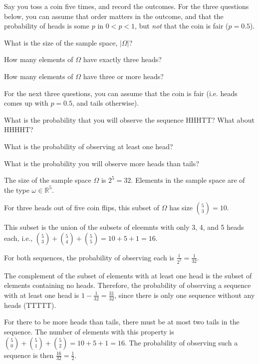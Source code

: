 \documentclass[11pt]{article}
\begin{document}

Say you toss a coin five times, and record the outcomes. For the three questions
below, you can assume that order matters in the outcome, and that the
probability of heads is some $p$ in $0 < p < 1$, but \textit{not} that the coin
is fair ($p = 0.5$).

\begin{Parts}
\Part What is the size of the sample space, $|\Omega|$?

\Part How many elements of $\Omega$ have exactly three heads?

\Part How many elements of $\Omega$ have three or more heads?
\end{Parts}

For the next three questions, you can assume that the coin is fair (i.e. heads 
comes up with $p=0.5$, and tails otherwise).

\begin{Parts}[resume]
\Part What is the probability that you will observe the sequence HHHTT? What 
about HHHHT?

\Part What is the probability of observing at least one head?

\Part What is the probability you will observe more heads than tails?

\end{Parts}

\begin{solution}

\begin{Parts}
\Part The size of the sample space $\Omega$ is $2^5=32$. Elements in the sample
space are of the type $\omega \in \mathbb{R}^5$.

\Part For three heads out of five coin flips, this subset of $\Omega$ has size
$\binom{5}{3}=10$.

\Part This subset is the union of the subsets of eleemnts with only 3, 4, and 5
heads each, i.e., $\binom{5}{3} + \binom{5}{4} + \binom{5}{5} = 10 + 5 + 1 = 16$.

\Part For both sequences, the probability of observing each is $\frac{1}{2^5} =
\frac{1}{32}$.

\Part The complement of the subset of elements with at least one head is the 
subset of elements containing no heads. Therefore, the probability of observing
a sequence with at least one head is $1 - \frac{1}{32} = \frac{31}{32}$, since
there is only one sequence without any heads (TTTTT).

\Part For there to be more heads than tails, there must be at most two tails
in the sequence. The number of elements with this property is $\binom{5}{0}
+ \binom{5}{1} + \binom{5}{2} = 10 + 5 + 1 = 16$. The probability of 
observing such a sequence is then $\frac{16}{32} = \frac{1}{2}$.

\end{Parts}

\end{solution}
\end{document}
